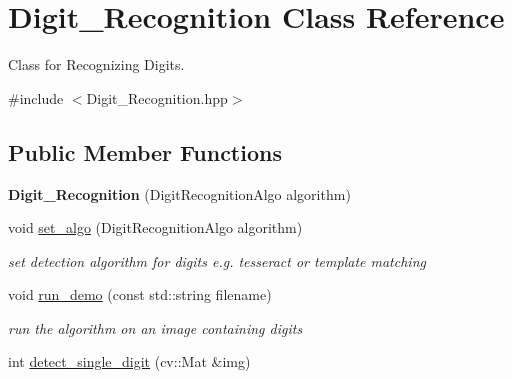 \hypertarget{class_digit___recognition}{}\section{Digit\+\_\+\+Recognition Class Reference}
\label{class_digit___recognition}


Class for Recognizing Digits.  




{\ttfamily \#include $<$Digit\+\_\+\+Recognition.\+hpp$>$}

\subsection*{Public Member Functions}
\begin{DoxyCompactItemize}
\item 
\mbox{\label{class_digit___recognition_a183d686f4f9f3ce1ed555e9311d30f56}} 
{\bfseries Digit\+\_\+\+Recognition} (Digit\+Recognition\+Algo algorithm)
\item 
\mbox{\label{class_digit___recognition_a5c83d879c6881693c3606cc5a1bc8ef2}} 
void \mbox{\hyperlink{class_digit___recognition_a5c83d879c6881693c3606cc5a1bc8ef2}{set\+\_\+algo}} (Digit\+Recognition\+Algo algorithm)
\begin{DoxyCompactList}\small\item\em set detection algorithm for digits e.\+g. tesseract or template matching \end{DoxyCompactList}\item 
\mbox{\label{class_digit___recognition_a3e96d90018e48c638debc82b66f2662a}} 
void \mbox{\hyperlink{class_digit___recognition_a3e96d90018e48c638debc82b66f2662a}{run\+\_\+demo}} (const std\+::string filename)
\begin{DoxyCompactList}\small\item\em run the algorithm on an image containing digits \end{DoxyCompactList}\item 
int \mbox{\hyperlink{class_digit___recognition_adc3ce374dcfcbf4b58b645a7ec95e725}{detect\+\_\+single\+\_\+digit}} (cv\+::\+Mat \&img)
\item 
\mbox{\label{class_digit___recognition_ac86fd9273fe2bf09efc1b804d49e370f}} 

\end{DoxyCompactItemize}
